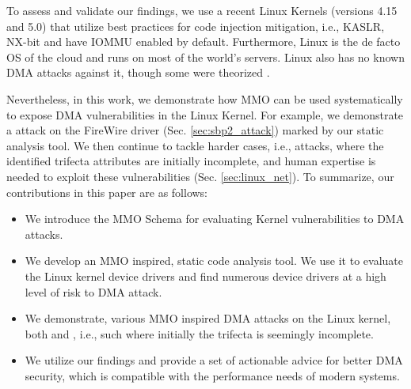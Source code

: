 To assess and validate our findings, we use a recent Linux Kernels (versions 4.15 and 5.0) that utilize best practices for code injection mitigation, i.e., KASLR, NX-bit and have IOMMU enabled by default. Furthermore, Linux is the de facto OS of the cloud and runs on most of the world's servers. Linux also has no known DMA attacks against it, though some were theorized \cite{MMT16,thunder}. 

Nevertheless, in this work, we demonstrate how MMO can be used systematically to expose DMA vulnerabilities in the Linux Kernel. For example, we demonstrate a \simple{} attack on the FireWire \spb{} driver (Sec. \ref{sec:sbp2_attack}) marked by our static analysis tool. 
We then continue to tackle harder cases, i.e., \compound{} attacks, where the identified trifecta attributes are initially incomplete, and human expertise is needed to exploit these vulnerabilities (Sec. \ref{sec:linux_net}). To summarize, our contributions in this paper are as follows:
\begin{itemize}
    \item We introduce the MMO Schema for evaluating Kernel vulnerabilities to DMA attacks. 
    \item We develop an MMO inspired, static code analysis tool. We use it to evaluate the Linux kernel device drivers and find numerous device drivers at a high level of risk to DMA attack.
    \item We demonstrate, various MMO inspired DMA attacks on the Linux kernel, both \simple{} and \compound{}, i.e., such where initially the trifecta is seemingly incomplete. 
    \item We utilize our findings and provide a set of actionable advice for better DMA security, which is compatible with the performance needs of modern systems.
\end{itemize}